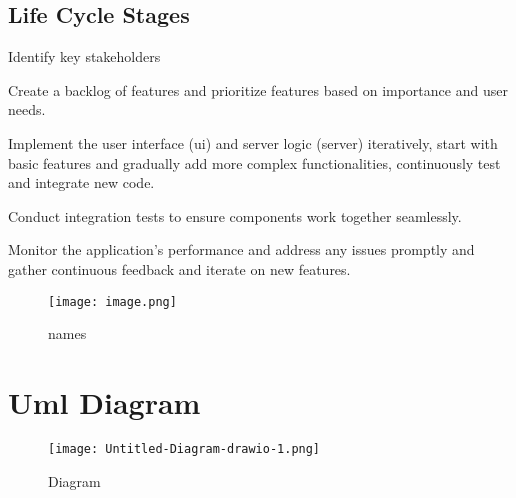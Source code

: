 \documentclass{article}
\begin{document}
\subsection{Life Cycle Stages}
Identify key stakeholders

Create a backlog of features and prioritize features based on importance and user needs.

Implement the user interface (ui) and server logic (server) iteratively,
start with basic features and gradually add more complex functionalities,
continuously test and integrate new code.

Conduct integration tests to ensure components work together seamlessly.

Monitor the application's performance and address any issues promptly and gather continuous feedback and iterate on new features.


\begin{figure}[H]
    \centering
    \texttt{[image: image.png]}
    \caption{names}
\end{figure}

\section{Uml Diagram}
\begin{figure}[H]
    \centering
    \texttt{[image: Untitled-Diagram-drawio-1.png]}
    \caption{Diagram}
\end{figure}
\end{document}
